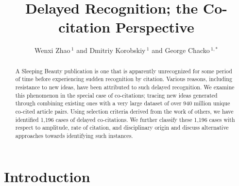 \documentclass[utf8]{frontiersSCNS}
\def\firstAuthorLast{Zhao {et~al.}} %
\def\Authors{Wenxi Zhao\,$^{1}$ and Dmitriy Korobskiy\,$^{1}$  and George Chacko\,$^{1,*}$} %
\begin{document}
\onecolumn
{}

\title[Delayed Co-citations]{Delayed Recognition; the Co-citation Perspective} 

\author[\firstAuthorLast ]{\Authors} %
\address{} %
\correspondance{} %

\extraAuth{}%

\maketitle

\begin{abstract}
A Sleeping Beauty publication is one that is apparently unrecognized for some period of time before experiencing sudden recognition by citation. Various reasons, including resistance to new ideas, have been attributed to such delayed recognition. We examine this phenomenon in the special case of co-citations; tracing new ideas generated through combining existing ones with a very large dataset of over 940 million unique co-cited article pairs. Using selection criteria derived from the work of others, we have identified 1,196 cases of delayed co-citations. We further classify these 1,196 cases with respect to amplitude, rate of citation, and disciplinary origin and discuss alternative approaches towards identifying such instances.

\end{abstract}

\section{Introduction}
\end{document}
